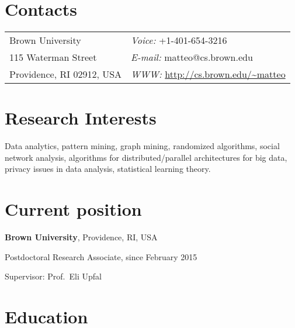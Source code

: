 \documentclass[margin,line]{resume}
\newif\ifwebversion
\begin{document}
\begin{resume}

  \section{\sc Contacts}
\vspace{.05in}

	\begin{tabular}{@{}p{2.8in}p{3.2in}}
	Brown University & {\it Voice:} +1-401-654-3216 \\ 
	115 Waterman Street & {\it E-mail:}  matteo@cs.brown.edu  \\
	Providence, RI 02912, USA &  {\it WWW:} \url{http://cs.brown.edu/~matteo}  \\
	\end{tabular}


\section{\sc Research Interests}

{Data analytics, pattern mining, graph mining, randomized algorithms, social
network analysis, algorithms for distributed/parallel architectures for big
data, privacy issues in data analysis, statistical learning theory.}

\section{\sc Current position}
{\bf Brown University}, Providence, RI, USA\\
\vspace*{-.18in}
\begin{list1}
\item[] Postdoctoral Research Associate, since February 2015 
\begin{list2}
\item Supervisor: Prof.~Eli Upfal
\end{list2}
\end{list1}

\section{\sc Education}


\end{resume}
\end{document}
